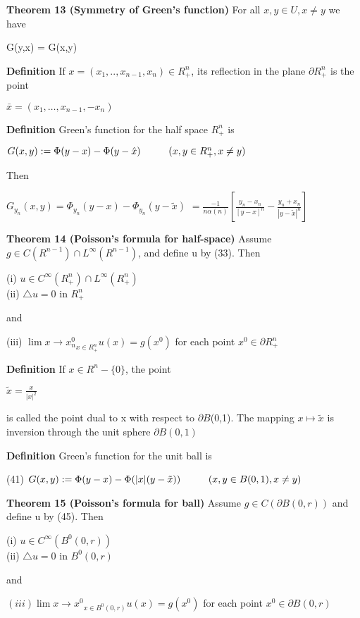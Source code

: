\documentclass{article}
\newcommand\tab[1][1cm]{\hspace*{#1}}
\begin{document}
\textbf {Theorem 13 (Symmetry of Green's function)} For all $x,y \in U, x \neq y$ we have
\begin{center}
G(y,x) = G(x,y)
\end{center}

\textbf {Definition} If $x = (x_1,.., x_{n-1}, x_n) \in R^n_+$, its reflection in the plane $\partial R^n_+$ is the point
\begin{center}
$\bar{x} = (x_1, \dots, x_{n-1}, -x_n)$
\end{center}

\textbf {Definition} Green's function for the half space $R^n_+$ is 
\begin{center}
$G(x,y) := \Phi(y-x)- \Phi(y-\hat{x}) \tab (x,y \in R^n_+, x \neq y)$
\end{center}
Then
\begin{center}
$G_{y_{n}}(x,y) = \Phi_{y_{n}} (y-x) - \Phi_{y_{n}}(y-\tilde{x})$
$= \frac{-1}{n\alpha(n)} [\frac{y_n - x_n}{[y-x]^n} - \frac{y_n + x_n}{|y-\tilde{x}|^n}]$
\end{center}

\textbf {Theorem 14 (Poisson's formula for half-space)} Assume $g \in C(R^{n-1}) \cap L^{\infty}(R^{n-1})$, and define u by (33). Then
\begin{center}
(i) $u \in C^{\infty}(R^n_+) \cap L^{\infty} (R^n_+)$ \\
(ii) $\triangle u = 0$ in $R^n_+$
\end{center}
and 
\begin{center}
(iii) $\lim{{x \to x_n^0}_{x \in R_+^n}} u(x) = g(x^0)$ for each point $x^0 \in \partial R^n_+$
\end{center}

\textbf {Definition} If $x \in R^n - \{0\}$, the point
\begin{center}
$\tilde{x} = \frac{x}{|x|^2}$
\end{center}
is called the point dual to x with respect to $\partial B$(0,1). The mapping $x \mapsto \tilde{x}$ is inversion through the unit sphere $\partial B(0,1)$

\textbf {Definition} Green's function for the unit ball is
\begin{center}
(41) \tab $G(x,y) := \Phi(y-x) - \Phi(|x|(y-\tilde{x})) \tab (x,y \in B(0,1), x \neq y)$
\end{center}

\textbf {Theorem 15 (Poisson's formula for ball)} Assume $g \in C(\partial B(0,r))$ and define u by (45). Then
\begin{center}
(i) $u \in C^{\infty} (B^0(0,r))$ \\
(ii) $\triangle u = 0$ in $B^0(0,r)$
\end{center}
and 
\begin{center}
$ (iii) \lim {x \to x^0}_{x \in B^0(0,r)} u(x) = g(x^0)$ for each point $x^0 \in \partial B(0,r)$
\end{center}
\end{document}
